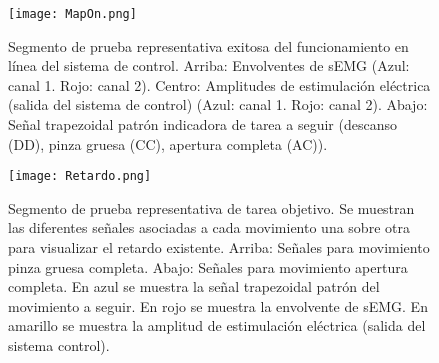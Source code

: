 
\begin{figure}[htbp]
	\centering
	\texttt{[image: MapOn.png]}
	\caption[Segmento de prueba representativa exitosa del funcionamiento en línea del sistema de control]{Segmento de prueba representativa exitosa del funcionamiento en línea del sistema de control.  Arriba: Envolventes de sEMG (Azul: canal 1. Rojo: canal 2). Centro: Amplitudes de estimulación eléctrica (salida del sistema de control) (Azul: canal 1. Rojo: canal 2). Abajo: Señal trapezoidal patrón indicadora de tarea a seguir (descanso (DD), pinza gruesa (CC), apertura completa (AC)).}
	\label{Figura: MapOn}
\end{figure}



\begin{figure}[htbp]
	\centering
	\texttt{[image: Retardo.png]}
	\caption[Segmento de prueba representativa de tarea objetivo]{Segmento de prueba representativa de tarea objetivo. Se muestran las diferentes señales asociadas a cada movimiento una sobre otra para visualizar el retardo existente. Arriba: Señales para movimiento pinza gruesa completa. Abajo: Señales para movimiento apertura completa. En azul se muestra la señal trapezoidal patrón del movimiento a seguir. En rojo se muestra la envolvente de sEMG. En amarillo se muestra la amplitud de estimulación eléctrica (salida del sistema control).}
	\label{Figura: Retardo}
\end{figure}

